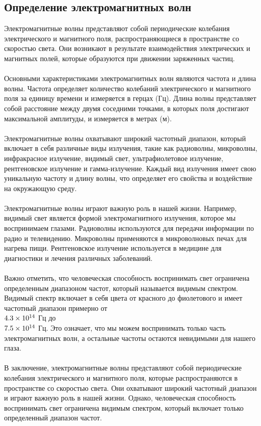 \documentclass{article}
\begin{document}
\subsection{Определение электромагнитных волн}
Электромагнитные волны представляют собой периодические колебания электрического и магнитного поля, распространяющиеся в пространстве со скоростью света. Они возникают в результате взаимодействия электрических и магнитных полей, которые образуются при движении заряженных частиц.\\
~\\
Основными характеристиками электромагнитных волн являются частота и длина волны. Частота определяет количество колебаний электрического и магнитного поля за единицу времени и измеряется в герцах (Гц). Длина волны представляет собой расстояние между двумя соседними точками, в которых поля достигают максимальной амплитуды, и измеряется в метрах (м).\\
~\\
Электромагнитные волны охватывают широкий частотный диапазон, который включает в себя различные виды излучения, такие как радиоволны, микроволны, инфракрасное излучение, видимый свет, ультрафиолетовое излучение, рентгеновское излучение и гамма-излучение. Каждый вид излучения имеет свою уникальную частоту и длину волны, что определяет его свойства и воздействие на окружающую среду.\\
~\\
Электромагнитные волны играют важную роль в нашей жизни. Например, видимый свет является формой электромагнитного излучения, которое мы воспринимаем глазами. Радиоволны используются для передачи информации по радио и телевидению. Микроволны применяются в микроволновых печах для нагрева пищи. Рентгеновское излучение используется в медицине для диагностики и лечения различных заболеваний.\\
~\\
Важно отметить, что человеческая способность воспринимать свет ограничена определенным диапазоном частот, который называется видимым спектром. Видимый спектр включает в себя цвета от красного до фиолетового и имеет частотный диапазон примерно от \\$4.3 \times 10^{14}\\$ Гц до \\$7.5 \times 10^{14}\\$ Гц. Это означает, что мы можем воспринимать только часть электромагнитных волн, а остальные частоты остаются невидимыми для нашего глаза.\\
~\\
В заключение, электромагнитные волны представляют собой периодические колебания электрического и магнитного поля, которые распространяются в пространстве со скоростью света. Они охватывают широкий частотный диапазон и играют важную роль в нашей жизни. Однако, человеческая способность воспринимать свет ограничена видимым спектром, который включает только определенный диапазон частот.
\end{document}
